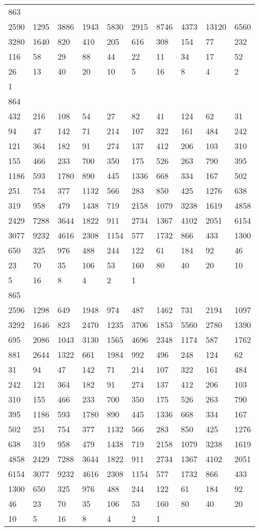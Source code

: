\begin{longtable}{*{10}{l}}
863&&&&&&&&&\\
2590& 1295& 3886& 1943& 5830& 2915& 8746& 4373& 13120& 6560\\
3280& 1640& 820& 410& 205& 616& 308& 154& 77& 232\\
116& 58& 29& 88& 44& 22& 11& 34& 17& 52\\
26& 13& 40& 20& 10& 5& 16& 8& 4& 2\\
1& \\

864&&&&&&&&&\\
432& 216& 108& 54& 27& 82& 41& 124& 62& 31\\
94& 47& 142& 71& 214& 107& 322& 161& 484& 242\\
121& 364& 182& 91& 274& 137& 412& 206& 103& 310\\
155& 466& 233& 700& 350& 175& 526& 263& 790& 395\\
1186& 593& 1780& 890& 445& 1336& 668& 334& 167& 502\\
251& 754& 377& 1132& 566& 283& 850& 425& 1276& 638\\
319& 958& 479& 1438& 719& 2158& 1079& 3238& 1619& 4858\\
2429& 7288& 3644& 1822& 911& 2734& 1367& 4102& 2051& 6154\\
3077& 9232& 4616& 2308& 1154& 577& 1732& 866& 433& 1300\\
650& 325& 976& 488& 244& 122& 61& 184& 92& 46\\
23& 70& 35& 106& 53& 160& 80& 40& 20& 10\\
5& 16& 8& 4& 2& 1& \\

865&&&&&&&&&\\
2596& 1298& 649& 1948& 974& 487& 1462& 731& 2194& 1097\\
3292& 1646& 823& 2470& 1235& 3706& 1853& 5560& 2780& 1390\\
695& 2086& 1043& 3130& 1565& 4696& 2348& 1174& 587& 1762\\
881& 2644& 1322& 661& 1984& 992& 496& 248& 124& 62\\
31& 94& 47& 142& 71& 214& 107& 322& 161& 484\\
242& 121& 364& 182& 91& 274& 137& 412& 206& 103\\
310& 155& 466& 233& 700& 350& 175& 526& 263& 790\\
395& 1186& 593& 1780& 890& 445& 1336& 668& 334& 167\\
502& 251& 754& 377& 1132& 566& 283& 850& 425& 1276\\
638& 319& 958& 479& 1438& 719& 2158& 1079& 3238& 1619\\
4858& 2429& 7288& 3644& 1822& 911& 2734& 1367& 4102& 2051\\
6154& 3077& 9232& 4616& 2308& 1154& 577& 1732& 866& 433\\
1300& 650& 325& 976& 488& 244& 122& 61& 184& 92\\
46& 23& 70& 35& 106& 53& 160& 80& 40& 20\\
10& 5& 16& 8& 4& 2& 1& \\


\end{longtable}
